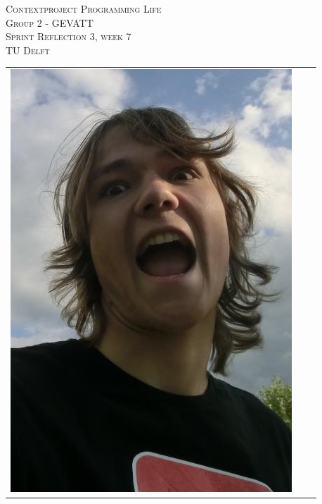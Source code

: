 \begin{titlepage}
\begin{center}
\textsc{\LARGE Contextproject Programming Life}\\
\vspace{10pt}
\textsc{\LARGE Group 2 - GEVATT}\\
\vspace{10pt}
\textsc{\LARGE Sprint Reflection 3, week 7}\\
\vspace{10pt}
\textsc{\large TU Delft}

\begin{table}[ht]
\centering
\begin{tabular}{ccc}
\includegraphics[scale=0.2]{../photos/ruben.png}   &

\end{tabular}
\end{table}
\end{center}
\end{titlepage}
